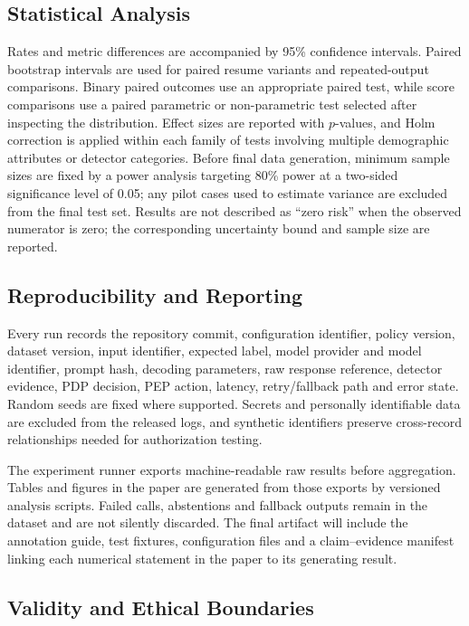 \documentclass[conference]{IEEEtran}
\begin{document}
\subsection{Statistical Analysis}

Rates and metric differences are accompanied by 95\% confidence intervals. Paired bootstrap intervals are used for paired resume variants and repeated-output comparisons. Binary paired outcomes use an appropriate paired test, while score comparisons use a paired parametric or non-parametric test selected after inspecting the distribution. Effect sizes are reported with $p$-values, and Holm correction is applied within each family of tests involving multiple demographic attributes or detector categories. Before final data generation, minimum sample sizes are fixed by a power analysis targeting 80\% power at a two-sided significance level of 0.05; any pilot cases used to estimate variance are excluded from the final test set. Results are not described as ``zero risk'' when the observed numerator is zero; the corresponding uncertainty bound and sample size are reported.

\subsection{Reproducibility and Reporting}

Every run records the repository commit, configuration identifier, policy version, dataset version, input identifier, expected label, model provider and model identifier, prompt hash, decoding parameters, raw response reference, detector evidence, PDP decision, PEP action, latency, retry/fallback path and error state. Random seeds are fixed where supported. Secrets and personally identifiable data are excluded from the released logs, and synthetic identifiers preserve cross-record relationships needed for authorization testing.

The experiment runner exports machine-readable raw results before aggregation. Tables and figures in the paper are generated from those exports by versioned analysis scripts. Failed calls, abstentions and fallback outputs remain in the dataset and are not silently discarded. The final artifact will include the annotation guide, test fixtures, configuration files and a claim--evidence manifest linking each numerical statement in the paper to its generating result.

\subsection{Validity and Ethical Boundaries}
\end{document}
